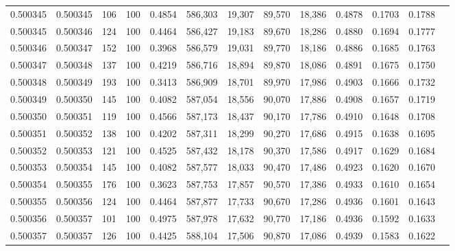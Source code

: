\begin{tabular}{rrrrrrrrrrrrr}
0.500345 & 0.500345 &   106 & 100 &                                     0.4854 & 586,303 &  19,307 &  89,570 &  18,386 & 0.4878 & 0.1703 & 0.1788 \\
0.500345 & 0.500346 &   124 & 100 &                                     0.4464 & 586,427 &  19,183 &  89,670 &  18,286 & 0.4880 & 0.1694 & 0.1777 \\
0.500346 & 0.500347 &   152 & 100 &                                     0.3968 & 586,579 &  19,031 &  89,770 &  18,186 & 0.4886 & 0.1685 & 0.1763 \\
0.500347 & 0.500348 &   137 & 100 &                                     0.4219 & 586,716 &  18,894 &  89,870 &  18,086 & 0.4891 & 0.1675 & 0.1750 \\
0.500348 & 0.500349 &   193 & 100 &                                     0.3413 & 586,909 &  18,701 &  89,970 &  17,986 & 0.4903 & 0.1666 & 0.1732 \\
0.500349 & 0.500350 &   145 & 100 &                                     0.4082 & 587,054 &  18,556 &  90,070 &  17,886 & 0.4908 & 0.1657 & 0.1719 \\
0.500350 & 0.500351 &   119 & 100 &                                     0.4566 & 587,173 &  18,437 &  90,170 &  17,786 & 0.4910 & 0.1648 & 0.1708 \\
0.500351 & 0.500352 &   138 & 100 &                                     0.4202 & 587,311 &  18,299 &  90,270 &  17,686 & 0.4915 & 0.1638 & 0.1695 \\
0.500352 & 0.500353 &   121 & 100 &                                     0.4525 & 587,432 &  18,178 &  90,370 &  17,586 & 0.4917 & 0.1629 & 0.1684 \\
0.500353 & 0.500354 &   145 & 100 &                                     0.4082 & 587,577 &  18,033 &  90,470 &  17,486 & 0.4923 & 0.1620 & 0.1670 \\
0.500354 & 0.500355 &   176 & 100 &                                     0.3623 & 587,753 &  17,857 &  90,570 &  17,386 & 0.4933 & 0.1610 & 0.1654 \\
0.500355 & 0.500356 &   124 & 100 &                                     0.4464 & 587,877 &  17,733 &  90,670 &  17,286 & 0.4936 & 0.1601 & 0.1643 \\
0.500356 & 0.500357 &   101 & 100 &                                     0.4975 & 587,978 &  17,632 &  90,770 &  17,186 & 0.4936 & 0.1592 & 0.1633 \\
0.500357 & 0.500357 &   126 & 100 &                                     0.4425 & 588,104 &  17,506 &  90,870 &  17,086 & 0.4939 & 0.1583 & 0.1622 \\

\end{tabular}
